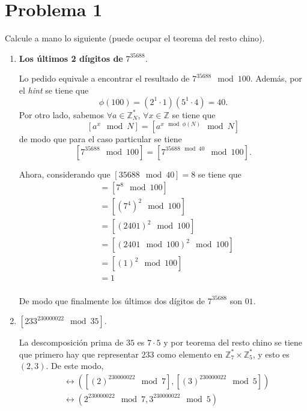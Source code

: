 \documentclass[twoside]{tareas}
\begin{document}
\maketitle

\section*{Problema 1}

Calcule a mano lo siguiente (puede ocupar el teorema del resto chino).

\begin{enumerate}
    \item \textbf{Los últimos 2 díıgitos de} {\boldmath$7^{35688}$}.

    Lo pedido equivale a encontrar el resultado de $7^{35688} \mod 100$. Además, por el \textit{hint} se tiene que
    $$\phi(100) = (2^1 \cdot 1) (5 ^ 1 \cdot 4) = 40.$$
    Por otro lado, sabemos $\forall a \in \mathbb{Z}^*_N$, $\forall x \in \mathbb{Z}$ se tiene que
    $$[a^{x} \mod N] = [a^{x \mod \phi(N)} \mod N]$$
    de modo que para el caso particular se tiene
    $$[7^{35688} \mod 100] = [7^{35688 \mod 40} \mod 100].$$

    Ahora, considerando que $[35688 \mod 40] = 8$ se tiene que
    \begin{align*}
        [7^{35688 \mod 40} \mod 100] &= [7^{8} \mod 100]\\
        &= [(7^4)^2 \mod 100]\\
        &= [(2401)^2 \mod 100]\\
        &= [(2401 \mod 100)^2 \mod 100]\\
        &= [(1)^2 \mod 100]\\
        &= 1\\
    \end{align*}

    De modo que finalmente los últimos dos dígitos de $7^{35688}$ son $01$.


    \item {\boldmath$[233^{230000022} \mod 35]$}.

    La descomposición prima de $35$ es $7\cdot 5$ y por teorema del resto chino se tiene que primero hay que representar $233$ como elemento en $\mathbb{Z}^*_7 \times \mathbb{Z}^*_5$, y esto es $(2, 3)$. De este modo,
    \begin{align*}
        [233^{230000022} \mod 35] &\leftrightarrow ([(2)^{230000022} \mod 7], [(3)^{230000022} \mod 5])\\
        &\leftrightarrow (2^{230000022} \mod 7, 3^{230000022} \mod 5)
    \end{align*}


\end{enumerate}
\end{document}

